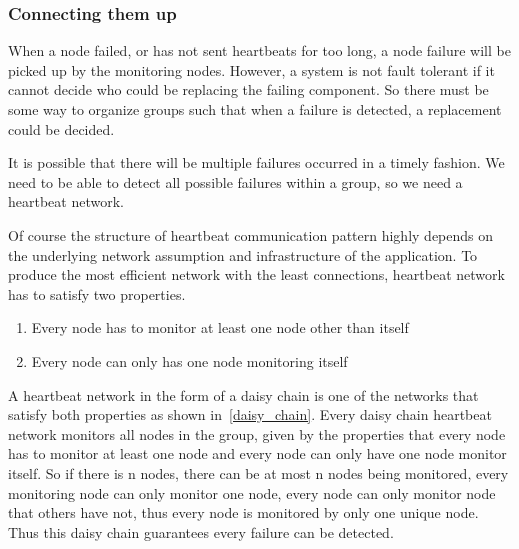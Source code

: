 \subsubsection{Connecting them up}


When a node failed, or has not sent heartbeats for too long, a node failure
will be picked up by the monitoring nodes. However, a system is not fault
tolerant if it cannot decide who could be replacing the failing component. So
there must be some way to organize groups such that when a failure is detected,
a replacement could be decided.


It is possible that there will be multiple failures occurred in a timely
fashion. We need to be able to detect all possible failures within a group, so we need a heartbeat network.


Of course the structure of heartbeat communication pattern highly depends on the underlying network assumption and infrastructure of the application. To produce the most efficient network with the least connections, heartbeat network has to satisfy two properties.

\begin{enumerate}
\item Every node has to monitor at least one node other than itself
\item Every node can only has one node monitoring itself
\end{enumerate}


A heartbeat network in the form of a daisy chain is one of the networks that
satisfy both properties as shown in~\ref{daisy_chain}. Every daisy chain heartbeat network monitors all nodes
in the group, given by the properties that every node has to monitor at least
one node and every node can only have one node monitor itself. So if there is
n nodes, there can be at most n nodes being monitored, every monitoring node
can only monitor one node, every node can only monitor node that others have
not, thus every node is monitored by only one unique node. Thus this daisy
chain guarantees every failure can be detected.

